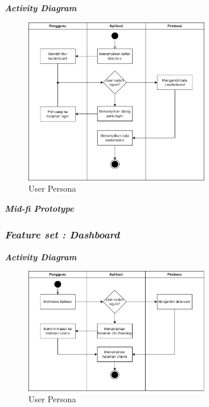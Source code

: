 \textbf{\textit{Activity Diagram}}
\begin{figure}[H]
	\centering
	\includegraphics[width=0.7\textwidth]{contents/chapter-3/images/AD-leaderboard.png}
	\caption[Caption]{User Persona}
	\label{Fig:UserPersona}
\end{figure}

\textbf{\textit{Mid-fi Prototype}}

\subsubsection{\textit{Feature set : Dashboard}}
\textbf{\textit{Activity Diagram}}
\begin{figure}[H]
	\centering
	\includegraphics[width=0.7\textwidth]{contents/chapter-3/images/AD-halamanutama.png}
	\caption[Caption]{User Persona}
	\label{Fig:UserPersona}
\end{figure}


